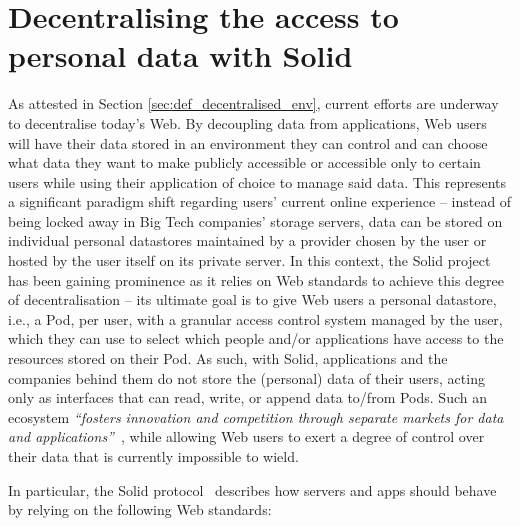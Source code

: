 \section{Decentralising the access to personal data with Solid}
\label{sec:sota_solid}

As attested in Section \ref{sec:def_decentralised_env}, current efforts are underway to decentralise today's Web. By decoupling data from applications, Web users will have their data stored in an environment they can control and can choose what data they want to make publicly accessible or accessible only to certain users while using their application of choice to manage said data.
This represents a significant paradigm shift regarding users' current online experience -- instead of being locked away in Big Tech companies' storage servers, data can be stored on individual personal datastores maintained by a provider chosen by the user or hosted by the user itself on its private server.
In this context, the Solid project~\citep{sambra_solid_2016,mansour_demonstration_2016} has been gaining prominence as it relies on Web standards to achieve this degree of decentralisation -- its ultimate goal is to give Web users a personal datastore, i.e., a Pod, per user, with a granular access control system managed by the user, which they can use to select which people and/or applications have access to the resources stored on their Pod.
As such, with Solid, applications and the companies behind them do not store the (personal) data of their users, acting only as interfaces that can read, write, or append data to/from Pods.
Such an ecosystem \textit{``fosters innovation and competition through separate markets for data and applications''}~\citep{verborgh_paradigm_2017}, while allowing Web users to exert a degree of control over their data that is currently impossible to wield.

In particular, the Solid protocol~\citep{capadisli_solid_2022} describes how servers and apps should behave by relying on the following Web standards:

